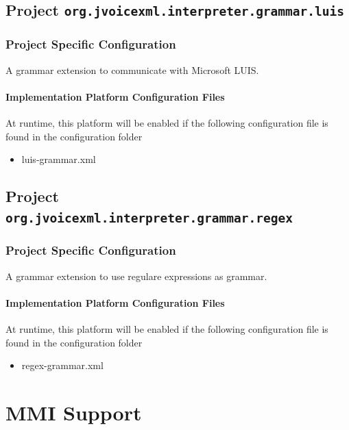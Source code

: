 \documentclass[11pt,a4paper]{article}
\begin{document}
\subsection{Project \texttt{org.jvoicexml.interpreter.grammar.luis}}

\subsubsection{Project Specific Configuration}

A grammar extension to communicate with Microsoft LUIS.

\paragraph{Implementation Platform Configuration Files}

At runtime, this platform will be enabled if the following configuration file is found in the configuration
folder
\begin{itemize}
\item luis-grammar.xml
\end{itemize}

\subsection{Project \texttt{org.jvoicexml.interpreter.grammar.regex}}

\subsubsection{Project Specific Configuration}

A grammar extension to use regulare expressions as grammar.

\paragraph{Implementation Platform Configuration Files}

At runtime, this platform will be enabled if the following configuration file is found in the configuration
folder
\begin{itemize}
\item regex-grammar.xml
\end{itemize}

\section {MMI Support}
\end{document}
